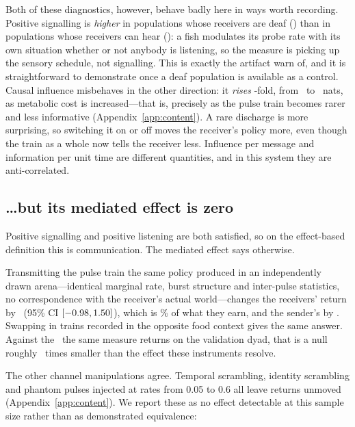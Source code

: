 Both of these diagnostics, however, behave badly here in ways worth recording.
Positive signalling is \emph{higher} in populations whose receivers are deaf
(\PSDeaf) than in populations whose receivers can hear (\PSHear): a fish
modulates its probe rate with its own situation whether or not anybody is
listening, so the measure is picking up the sensory schedule, not signalling.
This is exactly the artifact \citet{lowe2019pitfalls} warn of, and it is
straightforward to demonstrate once a deaf population is available as a control.
Causal influence misbehaves in the other direction: it \emph{rises}
\CIEFold-fold, from \CIECostZero\ to \CIECostHigh\ nats, as metabolic cost is
increased---that is, precisely as the pulse train becomes rarer and less
informative (Appendix~\ref{app:content}). A rare discharge is more surprising, so
switching it on or off moves the receiver's policy more, even though the train as
a whole now tells the receiver less. Influence per message and information per
unit time are different quantities, and in this system they are
anti-correlated.



\subsection{\dots but its mediated effect is zero}

Positive signalling and positive listening are both satisfied, so on the
effect-based definition this is communication. The mediated effect says
otherwise.

Transmitting the pulse train the same policy produced in an independently drawn
arena---identical marginal rate, burst structure and inter-pulse statistics, no
correspondence with the receiver's actual world---changes the receivers' return by
\FishNIE\ (95\% CI $[-0.98, 1.50]$), which is \FishNIEPct\% of what
they earn, and the sender's by \FishNIESender. Swapping in trains recorded in the
opposite food context gives the same answer. Against the \NIEHonest\ the same
measure returns on the validation dyad, that is a null roughly \NIERatio\ times
smaller than the effect these instruments resolve.

The other channel manipulations agree. Temporal scrambling, identity scrambling
and phantom pulses injected at rates from \num{0.05} to \num{0.6} all leave
returns unmoved (Appendix~\ref{app:content}). We report these as no effect
detectable at this sample size rather than as demonstrated equivalence:
\TOSTVERDICT

